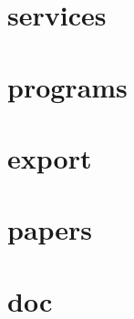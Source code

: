 \documentclass[8pt]{beamer}
\begin{document}
%
%

\section{services}

%
%

\section{programs}

%
%

\section{export}

%
%

\section{papers}

%
%

\section{doc}
\end{document}
